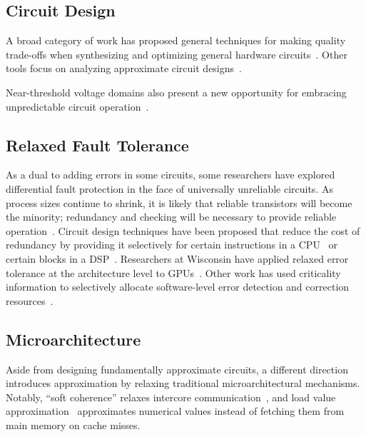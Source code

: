 \subsection{Circuit Design}

A broad category of work has proposed general techniques for making quality trade-offs
when synthesizing and optimizing general hardware
circuits~\cite{lossysynthesis, palem-pruning, rahimi, axilog, miao-thesis, synthesis-date14, venkataramani-date13, venkataramani-dac12}.
Other tools focus on analyzing approximate circuit
designs~\cite{venkatesan-iccad11, tziantzioulis-dac15}.

Near-threshold voltage domains also present a new opportunity for embracing
unpredictable circuit operation~\cite{soft-ntc}.

\subsection{Relaxed Fault Tolerance}

As a dual to adding errors in some circuits, some researchers have
explored differential fault protection in the face of universally unreliable
circuits. As process sizes continue to shrink, it is likely that reliable
transistors will become the minority; redundancy and checking will be
necessary to provide reliable operation~\cite{li-asplos08}. Circuit design
techniques have been proposed that reduce the cost of redundancy by providing
it selectively for certain instructions in a CPU~\cite{wreft} or certain
blocks in a DSP~\cite{unequal-protection, ant, micropower-dsp}.
Researchers at Wisconsin have applied relaxed error tolerance at the
architecture level to GPUs~\cite{palframan-gpu}.
Other work has used criticality information to selectively allocate
software-level error detection and correction
resources~\cite{khudia-tolerance, shi-cal}.

\subsection{Microarchitecture}

Aside from designing fundamentally approximate circuits, a different direction
introduces approximation by relaxing traditional microarchitectural
mechanisms.
Notably, ``soft coherence'' relaxes intercore
communication~\cite{softcoherence},
and load value approximation~\cite{lva-sanmiguel, lva-thwaites} approximates
numerical values instead of fetching them from main memory on cache misses.

